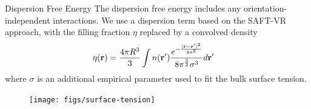 \documentclass[compress]{beamer}
\newcommand{\xx}{\textbf{r}}
\begin{document}





\begin{frame}[fragile]{Dispersion Free Energy}
  The dispersion free energy includes any orientation-independent
  interactions. We use a dispersion term based on the SAFT-VR
  approach, with the filling fraction $\eta$ replaced by a convolved
  density
  \begin{align*}
    \eta(\mathbf{r}) &= \frac{4\pi R^3}{3} \int n(\mathbf{r}')
    \frac{e^{-\frac{|\mathbf{r}-\mathbf{r}'|^2}{2\sigma^2}}}{8\pi^\frac32\sigma^3} d\mathbf{r}'
  \end{align*}
  where $\sigma$ is an additional empirical parameter used to fit the
  bulk surface tension.
\end{frame}

\begin{frame}[fragile]{}
\begin{figure}
\begin{center}
\texttt{[image: figs/surface-tension]}
\end{center}
\end{figure} 
\end{frame}
\end{document}
